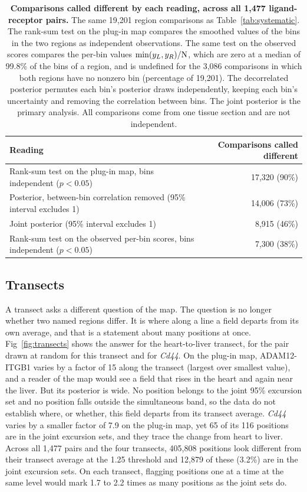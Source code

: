 \documentclass[10pt,letterpaper]{article}
\begin{document}
\begin{table}[!ht]
\centering
\caption{{\bf Comparisons called different by each reading, across all 1,477 ligand-receptor pairs.} The same 19,201 region comparisons as Table~\ref{tab:systematic}. The rank-sum test on the plug-in map compares the smoothed values of the bins in the two regions as independent observations. The same test on the observed scores compares the per-bin values $\min(y_L, y_R)/\mbox{N}$, which are zero at a median of 99.8\% of the bins of a region, and is undefined for the 3,086 comparisons in which both regions have no nonzero bin (percentage of 19,201). The decorrelated posterior permutes each bin's posterior draws independently, keeping each bin's uncertainty and removing the correlation between bins. The joint posterior is the primary analysis. All comparisons come from one tissue section and are not independent.}
\label{tab:readings}
\begin{tabular}{|l|r|}
  \hline
  Reading & Comparisons called different \\
  \hline
  Rank-sum test on the plug-in map, bins independent ($p<0.05$) & 17,320 (90\%) \\
  Posterior, between-bin correlation removed (95\% interval excludes 1) & 14,006 (73\%) \\
  Joint posterior (95\% interval excludes 1) & 8,915 (46\%) \\
  Rank-sum test on the observed per-bin scores, bins independent ($p<0.05$) & 7,300 (38\%) \\
  \hline
\end{tabular}
\end{table}

\subsection*{Transects}

A transect asks a different question of the map. The question is no longer whether two named regions differ. It is where along a line a field departs from its own average, and that is a statement about many positions at once. Fig~\ref{fig:transects} shows the answer for the heart-to-liver transect, for the pair drawn at random for this transect and for \textit{Cd44}. On the plug-in map, ADAM12-ITGB1 varies by a factor of 15 along the transect (largest over smallest value), and a reader of the map would see a field that rises in the heart and again near the liver. But its posterior is wide. No position belongs to the joint 95\% excursion set and no position falls outside the simultaneous band, so the data do not establish where, or whether, this field departs from its transect average. \textit{Cd44} varies by a smaller factor of 7.9 on the plug-in map, yet 65 of its 116 positions are in the joint excursion sets, and they trace the change from heart to liver. Across all 1,477 pairs and the four transects, 405,808 positions look different from their transect average at the 1.25 threshold and 12,879 of these (3.2\%) are in the joint excursion sets. On each transect, flagging positions one at a time at the same level would mark 1.7 to 2.2 times as many positions as the joint sets do.
\end{document}
